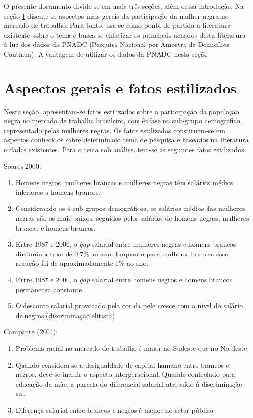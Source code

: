 \documentclass[12pt]{article}
\begin{document}
\par O presente documento divide-se em mais três seções, além dessa introdução. Na seção \ref{overview} discute-se aspectos mais gerais da participação da mulher negra no mercado de trabalho. Para tanto, usa-se como ponto de partida a literatura existente sobre o tema e busca-se enfatizar os principais achados desta literatura à luz dos dados da PNADC (Pesquisa Nacional por Amostra de Domicílios Contínua). A vantagem de utilizar os dados da PNADC nesta seção 

\section{Aspectos gerais e fatos estilizados} \label{overview}

\par Nesta seção, apresentam-se fatos estilizados sobre a participação da população negra no mercado de trabalho brasileiro, com ênfase no sub-grupo demográfico representado pelas mulheres negras. Os fatos estilizados constituem-se em aspectos conhecidos sobre determinado tema de pesquisa e baseados na literatura e dados existentes. Para o tema sob análise, tem-se os seguintes fatos estilizados:

\par Soares 2000:
\begin{enumerate}
    \item Homens negros, mulheres brancas e mulheres negras têm salários médios inferiores a homens brancos.
    \item Considerando os 4 sub-grupos demográficos, os salários médios das mulheres negras são os mais baixos, seguidos pelos salários de homens negros, mulheres brancas e homens brancos.
    \item Entre 1987 e 2000, o \textit{gap} salarial entre mulheres negras e homens brancos diminuiu à taxa de 0,7\% ao ano. Enquanto para mulheres brancas essa redução foi de aproximadamente 1\% ao ano.
    \item Entre 1987 e 2000, o \textit{gap} salarial entre homens negros e homens brancos permaneceu constante.
    \item O desconto salarial provocado pela cor da pele cresce com o nível do salário de negros (discriminação elitista)
\end{enumerate}

\par Campante (2004):

\begin{enumerate}
    \item Problema racial no mercado de trabalho é maior no Sudeste que no Nordeste
    \item Quando considera-se a desigualdade de capital humano entre brancos e negros, deve-se incluir o aspecto intergeracional. Quando controlado para educação da mãe, a parcela do diferencial salarial atribuído à discriminação cai.
    \item Diferença salarial entre brancos e negros é menor no setor público
\end{enumerate}
\end{document}
